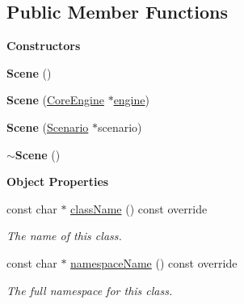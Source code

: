 \subsection*{Public Member Functions}
\begin{Indent}\textbf{ Constructors}\par
\begin{DoxyCompactItemize}
\item 
\mbox{\label{classrev_1_1_scene_ac530b7ec518da081f75fcabf6b8f088a}} 
{\bfseries Scene} ()
\item 
\mbox{\label{classrev_1_1_scene_a6b5c5f3b8474597b3aa38e0706af5128}} 
{\bfseries Scene} (\mbox{\hyperlink{classrev_1_1_core_engine}{Core\+Engine}} $\ast$\mbox{\hyperlink{classrev_1_1_scene_afdede377110c092bafeb649e0b8469a8}{engine}})
\item 
\mbox{\label{classrev_1_1_scene_ae08d8f6d9197b3df8034d86526bab13d}} 
{\bfseries Scene} (\mbox{\hyperlink{classrev_1_1_scenario}{Scenario}} $\ast$scenario)
\item 
\mbox{\label{classrev_1_1_scene_a16686c338278cb20fb7d8e575fd8ee3c}} 
{\bfseries $\sim$\+Scene} ()
\end{DoxyCompactItemize}
\end{Indent}
\begin{Indent}\textbf{ Object Properties}\par
\begin{DoxyCompactItemize}
\item 
\mbox{\label{classrev_1_1_scene_a6130a8500e3106d944072ba309339e82}} 
const char $\ast$ \mbox{\hyperlink{classrev_1_1_scene_a6130a8500e3106d944072ba309339e82}{class\+Name}} () const override
\begin{DoxyCompactList}\small\item\em The name of this class. \end{DoxyCompactList}\item 
\mbox{\label{classrev_1_1_scene_adce7b89900d921df3df9b4f6136fda83}} 
const char $\ast$ \mbox{\hyperlink{classrev_1_1_scene_adce7b89900d921df3df9b4f6136fda83}{namespace\+Name}} () const override
\begin{DoxyCompactList}\small\item\em The full namespace for this class. \end{DoxyCompactList}\end{DoxyCompactItemize}
\end{Indent}
